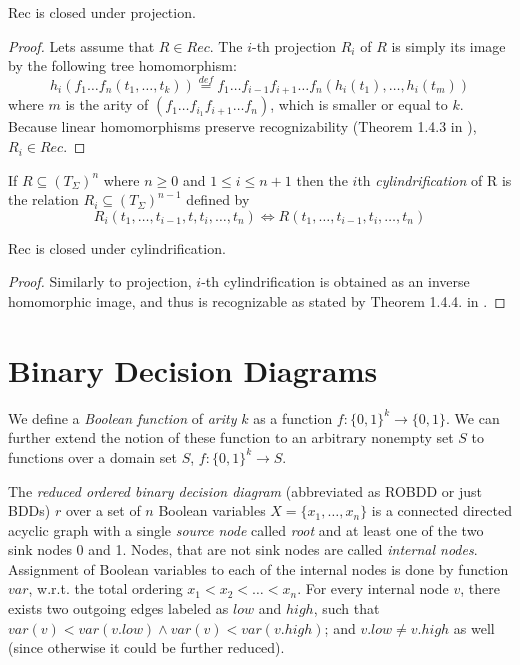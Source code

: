 \begin{lemma}
Rec is closed under projection.
\end{lemma}

\begin{proof}
 Lets assume that $R \in Rec$. The $i$-th projection $R_i$ of $R$ is simply its image by the following tree homomorphism: 
 \begin{equation}
 h_i(f_1\ldots f_n (t_1,\ldots,t_k)) \overset{def}{=} f_1\ldots f_{i-1}f_{i+1}\ldots f_n(h_i(t_1),\ldots,h_i(t_m))
\end{equation}
where $m$ is the arity of $(f_1\ldots f_{i_1}f_{i+1}\ldots f_n)$, which is smaller or equal to $k$. Because linear homomorphisms preserve recognizability (Theorem 1.4.3 in \cite{tata}), $R_i \in Rec$.
\end{proof}

\begin{defz}
 If $R \subseteq (T_\Sigma)^n$ where $n \geq 0$ and $1 \leq i \leq n+1$ then the $i$th \emph{cylindrification} of R is the relation $R_i \subseteq (T_\Sigma)^{n-1}$ defined by $$ R_i(t_1,\ldots,t_{i-1},t,t_i,\ldots,t_n) \Leftrightarrow R(t_1,\ldots,t_{i-1},t_i,\ldots,t_n)$$
\end{defz}

\begin{lemma}
Rec is closed under cylindrification.
\end{lemma}

\begin{proof}
 Similarly to projection, $i$-th cylindrification is obtained as an inverse homomorphic image, and thus is recognizable as stated by Theorem 1.4.4. in \cite{tata}.
\end{proof}

 \section{Binary Decision Diagrams}\label{bdd}

We define a \emph{Boolean function} of \emph{arity} $k$ as a function $f : \{0,1\}^k \longrightarrow \{0,1\}$. We can further extend the notion of these function to an arbitrary nonempty set $S$ to functions over a domain set $S$, $f : \{0,1\}^k \longrightarrow S$.

The \emph{reduced ordered binary decision diagram} (abbreviated as ROBDD or just BDDs) $r$ over a set of $n$ Boolean variables $X = \{x_1,\ldots,x_n\}$ is a connected directed acyclic graph with a single \emph{source node} called \emph{root} and at least one of the two sink nodes 0 and 1. Nodes, that are not sink nodes are called \emph{internal nodes}. Assignment of Boolean variables to each of the internal nodes is done by function $var$, w.r.t. the total ordering $x_1 < x_2 < \ldots < x_n$. For every internal node $v$, there exists two outgoing edges labeled as $low$ and $high$, such that $var(v) < var(v.low) \wedge var(v) < var(v.high)$; and $v.low \neq v.high$ as well (since otherwise it could be further reduced).

